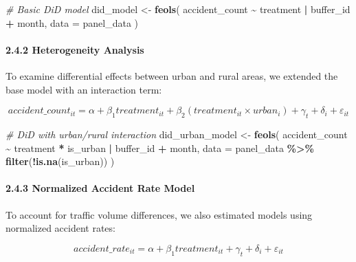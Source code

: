 \documentclass[
]{article}
\newenvironment{Shaded}{\begin{snugshade}}{\end{snugshade}}
\newcommand{\AttributeTok}[1]{\textcolor[rgb]{0.13,0.29,0.53}{#1}}
\newcommand{\CommentTok}[1]{\textcolor[rgb]{0.56,0.35,0.01}{\textit{#1}}}
\newcommand{\FunctionTok}[1]{\textcolor[rgb]{0.13,0.29,0.53}{\textbf{#1}}}
\newcommand{\NormalTok}[1]{#1}
\newcommand{\OtherTok}[1]{\textcolor[rgb]{0.56,0.35,0.01}{#1}}
\newcommand{\SpecialCharTok}[1]{\textcolor[rgb]{0.81,0.36,0.00}{\textbf{#1}}}
\begin{document}
\begin{Shaded}
\begin{Highlighting}[]
\CommentTok{\# Basic DiD model}
\NormalTok{did\_model }\OtherTok{\textless{}{-}} \FunctionTok{feols}\NormalTok{(}
\NormalTok{  accident\_count }\SpecialCharTok{\textasciitilde{}}\NormalTok{ treatment }\SpecialCharTok{|}\NormalTok{ buffer\_id }\SpecialCharTok{+}\NormalTok{ month,}
  \AttributeTok{data =}\NormalTok{ panel\_data}
\NormalTok{)}
\end{Highlighting}
\end{Shaded}

\paragraph{2.4.2 Heterogeneity Analysis}\label{heterogeneity-analysis}

To examine differential effects between urban and rural areas, we
extended the base model with an interaction term:

\[accident\_count_{it} = \alpha + \beta_1 treatment_{it} + \beta_2 (treatment_{it} \times urban_i) + \gamma_t + \delta_i + \varepsilon_{it}\]

\begin{Shaded}
\begin{Highlighting}[]
\CommentTok{\# DiD with urban/rural interaction}
\NormalTok{did\_urban\_model }\OtherTok{\textless{}{-}} \FunctionTok{feols}\NormalTok{(}
\NormalTok{  accident\_count }\SpecialCharTok{\textasciitilde{}}\NormalTok{ treatment }\SpecialCharTok{*}\NormalTok{ is\_urban }\SpecialCharTok{|}\NormalTok{ buffer\_id }\SpecialCharTok{+}\NormalTok{ month,}
  \AttributeTok{data =}\NormalTok{ panel\_data }\SpecialCharTok{\%\textgreater{}\%} \FunctionTok{filter}\NormalTok{(}\SpecialCharTok{!}\FunctionTok{is.na}\NormalTok{(is\_urban))}
\NormalTok{)}
\end{Highlighting}
\end{Shaded}

\paragraph{2.4.3 Normalized Accident Rate
Model}\label{normalized-accident-rate-model}

To account for traffic volume differences, we also estimated models
using normalized accident rates:

\[accident\_rate_{it} = \alpha + \beta_1 treatment_{it} + \gamma_t + \delta_i + \varepsilon_{it}\]
\end{document}
